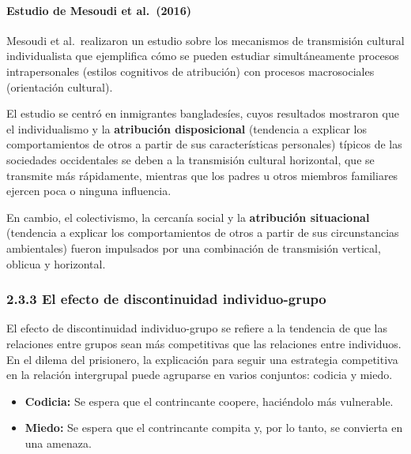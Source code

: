 \documentclass[
]{website}
\begin{document}
\paragraph*{Estudio de Mesoudi et al.~(2016)}\label{estudio-de-mesoudi-et-al.-2016}

Mesoudi et al.~realizaron un estudio sobre los mecanismos de transmisión cultural individualista que ejemplifica cómo se pueden estudiar simultáneamente procesos intrapersonales (estilos cognitivos de atribución) con procesos macrosociales (orientación cultural).

El estudio se centró en inmigrantes bangladesíes, cuyos resultados mostraron que el individualismo y la \textbf{atribución disposicional} (tendencia a explicar los comportamientos de otros a partir de sus características personales) típicos de las sociedades occidentales se deben a la transmisión cultural horizontal, que se transmite más rápidamente, mientras que los padres u otros miembros familiares ejercen poca o ninguna influencia.

En cambio, el colectivismo, la cercanía social y la \textbf{atribución situacional} (tendencia a explicar los comportamientos de otros a partir de sus circunstancias ambientales) fueron impulsados por una combinación de transmisión vertical, oblicua y horizontal.

\subsubsection*{2.3.3 El efecto de discontinuidad individuo-grupo}\label{subtema2_3_3}

El efecto de discontinuidad individuo-grupo se refiere a la tendencia de que las relaciones entre grupos sean más competitivas que las relaciones entre individuos. En el dilema del prisionero, la explicación para seguir una estrategia competitiva en la relación intergrupal puede agruparse en varios conjuntos: codicia y miedo.

\begin{itemize}
\item
  \textbf{Codicia:} Se espera que el contrincante coopere, haciéndolo más vulnerable.
\item
  \textbf{Miedo:} Se espera que el contrincante compita y, por lo tanto, se convierta en una amenaza.
\end{itemize}
\end{document}
